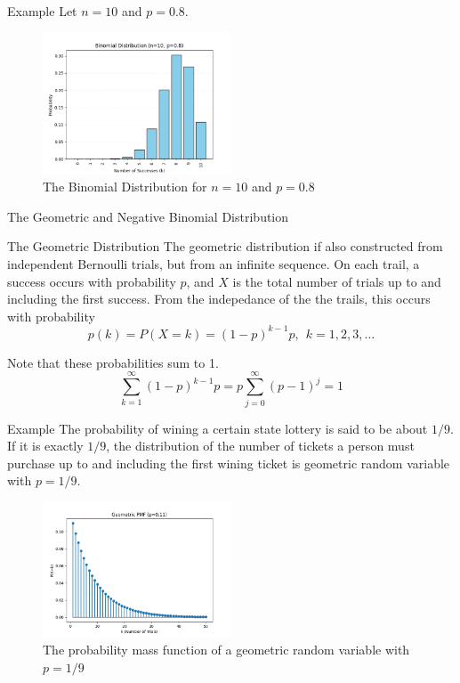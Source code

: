 \documentclass{beamer}
\begin{document}
\begin{frame}{Example}
    Let \(n=10\) and \(p=0.8\). \pause
    \begin{figure}
        \centering
        \includegraphics[width=0.5\textwidth]{Figures/Figure_3.png}
        \caption{The Binomial Distribution for \(n=10\) and \(p=0.8\)}
        \label{fig:binomial3}
    \end{figure}
\end{frame}

\begin{frame}{The Geometric and Negative Binomial Distribution}
    \begin{block}{The Geometric Distribution}
        The geometric distribution if also constructed from independent Bernoulli trials, but from an infinite sequence. \pause
        \vspace{0.1in}
        On each trail, a success occurs with probability \(p\), and \(X\) is the total number of trials up to and including the first success. \pause
        \vspace{0.1in}
        From the indepedance of the the trails, this occurs with probability \[
                p(k)= P(X=k)=(1-p)^{k-1}p, ~~k=1,2,3, \dots
        \]
    \end{block}\pause
    Note that these probabilities sum to 1. \[
    \sum_{k=1}^{\infty} (1-p)^{k-1}p = p \sum_{j=0}^{\infty}(p-1)^j=1
    \]
\end{frame}

\begin{frame}{Example}
    The probability of wining a certain state lottery is said to be about \(1/9\).\pause\\
    If it is exactly \(1/9\), the distribution of the number of tickets a person must purchase up to and including the first wining ticket is geometric random variable with \(p=1/9\).\pause
    \begin{figure}
        \centering
        \includegraphics[width=0.5\textwidth]{Figures/Figure_4.png}
        \caption{The probability mass function of a geometric random variable with \(p=1/9\)}
        \label{fig:geometric1}
    \end{figure}
\end{frame}
\end{document}
